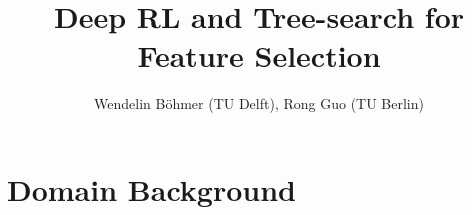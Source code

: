 

\title{Deep RL and Tree-search for Feature Selection}
\author{Wendelin B\"ohmer (TU Delft), Rong Guo (TU Berlin)}



\maketitle

\listoftodos

\section{Domain Background}

